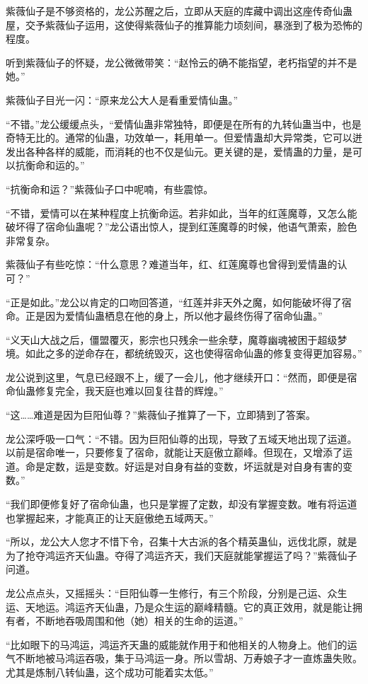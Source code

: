 \begin{this_body}
紫薇仙子是不够资格的，龙公苏醒之后，立即从天庭的库藏中调出这座传奇仙蛊屋，交予紫薇仙子运用，这使得紫薇仙子的推算能力顷刻间，暴涨到了极为恐怖的程度。

听到紫薇仙子的怀疑，龙公微微带笑：“赵怜云的确不能指望，老朽指望的并不是她。”

紫薇仙子目光一闪：“原来龙公大人是看重爱情仙蛊。”

“不错。”龙公缓缓点头，“爱情仙蛊非常独特，即便是在所有的九转仙蛊当中，也是奇特无比的。通常的仙蛊，功效单一，耗用单一。但爱情蛊却大异常类，它可以迸发出各种各样的威能，而消耗的也不仅是仙元。更关键的是，爱情蛊的力量，是可以抗衡命和运的。”

“抗衡命和运？”紫薇仙子口中呢喃，有些震惊。

“不错，爱情可以在某种程度上抗衡命运。若非如此，当年的红莲魔尊，又怎么能破坏得了宿命仙蛊呢？”龙公语出惊人，提到红莲魔尊的时候，他语气萧索，脸色非常复杂。

紫薇仙子有些吃惊：“什么意思？难道当年，红、红莲魔尊也曾得到爱情蛊的认可？”

“正是如此。”龙公以肯定的口吻回答道，“红莲并非天外之魔，如何能破坏得了宿命。正是因为爱情仙蛊栖息在他的身上，所以他才最终伤得了宿命仙蛊。”

“义天山大战之后，僵盟覆灭，影宗也只残余一些余孽，魔尊幽魂被困于超级梦境。如此之多的逆命存在，都统统毁灭，这也使得宿命仙蛊的修复变得更加容易。”

龙公说到这里，气息已经跟不上，缓了一会儿，他才继续开口：“然而，即便是宿命仙蛊修复完全，我天庭也难以回复往昔的辉煌。”

“这……难道是因为巨阳仙尊？”紫薇仙子推算了一下，立即猜到了答案。

龙公深呼吸一口气：“不错。因为巨阳仙尊的出现，导致了五域天地出现了运道。以前是宿命唯一，只要修复了宿命，就能让天庭傲立巅峰。但现在，又增添了运道。命是定数，运是变数。好运是对自身有益的变数，坏运就是对自身有害的变数。”

“我们即便修复好了宿命仙蛊，也只是掌握了定数，却没有掌握变数。唯有将运道也掌握起来，才能真正的让天庭傲绝五域两天。”

“所以，龙公大人您才不惜下令，召集十大古派的各个精英蛊仙，远伐北原，就是为了抢夺鸿运齐天仙蛊。夺得了鸿运齐天，我们天庭就能掌握运了吗？”紫薇仙子问道。

龙公点点头，又摇摇头：“巨阳仙尊一生修行，有三个阶段，分别是己运、众生运、天地运。鸿运齐天仙蛊，乃是众生运的巅峰精髓。它的真正效用，就是能让拥有者，不断地吞吸周围和他（她）相关的生命的运道。”

“比如眼下的马鸿运，鸿运齐天蛊的威能就作用于和他相关的人物身上。他们的运气不断地被马鸿运吞吸，集于马鸿运一身。所以雪胡、万寿娘子才一直炼蛊失败。尤其是炼制八转仙蛊，这个成功可能着实太低。”


\end{this_body}
